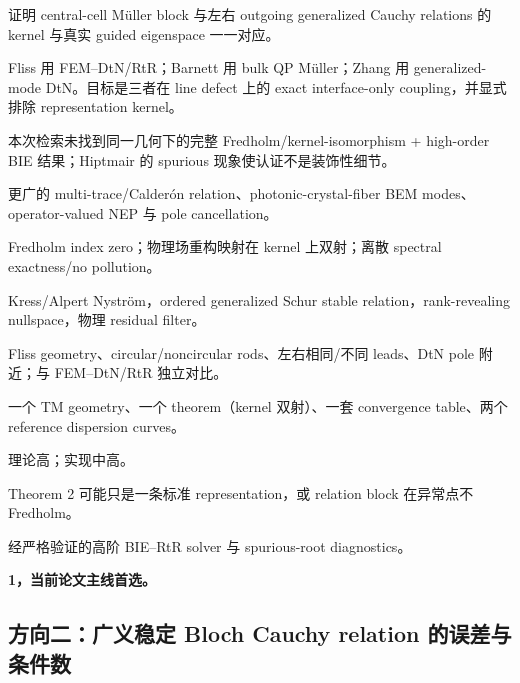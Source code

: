 \documentclass[UTF8,11pt,fontset=none]{ctexart}
\begin{document}
\begin{description}[style=multiline,leftmargin=4.4cm,labelwidth=4.1cm]
  \item[核心研究问题：] 证明 central-cell Müller block 与左右 outgoing generalized Cauchy relations 的 kernel 与真实 guided eigenspace 一一对应。
  \item[与已有文献的差异：] Fliss 用 FEM--DtN/RtR；Barnett 用 bulk QP Müller；Zhang 用 generalized-mode DtN。目标是三者在 line defect 上的 exact interface-only coupling，并显式排除 representation kernel。
  \item[为什么可能创新：] 本次检索未找到同一几何下的完整 Fredholm/kernel-isomorphism + high-order BIE 结果；Hiptmair 的 spurious 现象使认证不是装饰性细节。
  \item[继续核实的文献：] 更广的 multi-trace/Calderón relation、photonic-crystal-fiber BEM modes、operator-valued NEP 与 pole cancellation。
  \item[主要定理：] Fredholm index zero；物理场重构映射在 kernel 上双射；离散 spectral exactness/no pollution。
  \item[算法：] Kress/Alpert Nyström，ordered generalized Schur stable relation，rank-revealing nullspace，物理 residual filter。
  \item[数值实验：] Fliss geometry、circular/noncircular rods、左右相同/不同 leads、DtN pole 附近；与 FEM--DtN/RtR 独立对比。
  \item[最小可发表单元：] 一个 TM geometry、一个 theorem（kernel 双射）、一套 convergence table、两个 reference dispersion curves。
  \item[难度：] 理论高；实现中高。
  \item[主要风险：] Theorem 2 可能只是一条标准 representation，或 relation block 在异常点不 Fredholm。
  \item[失败时保留：] 经严格验证的高阶 BIE--RtR solver 与 spurious-root diagnostics。
  \item[推荐优先级：] \textbf{1，当前论文主线首选。}
\end{description}

\subsection{方向二：广义稳定 Bloch Cauchy relation 的误差与条件数}
\end{document}
